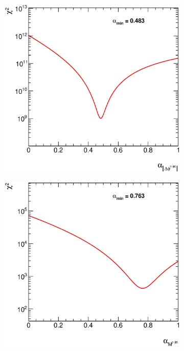 \documentclass[12pt, twoside]{article}
\numberwithin{equation}{section}
\numberwithin{figure}{section}
\newenvironment{changemargin}[2]{%
\begin{list}{}{%
\setlength{\topsep}{0pt}%
\setlength{\leftmargin}{#1}%
\setlength{\rightmargin}{#2}%
\setlength{\listparindent}{\parindent}%
\setlength{\itemindent}{\parindent}%
\setlength{\parsep}{\parskip}%
}%
\item[]}{\end{list}}
\begin{document}
\begin{figure}[H]
\begin{changemargin}{-0.5cm}{-0.0cm}
\begin{changemargin}{-0.0cm}{-0.5cm}
        \begin{subfigure}[b]{0.33\textwidth}
            \includegraphics[width=\textwidth]{./images/ChiSquareTest/CHI2-107.eps}
            \subcaption{}
            \label{fig:ChiSquareDeltaPhiPhotonJet}
        \end{subfigure}
        \begin{subfigure}[b]{0.33\textwidth}
            \includegraphics[width=\textwidth]{./images/ChiSquareTest/CHI2-108.eps}

\end{subfigure}
\end{changemargin}
\end{changemargin}
\end{figure}
\end{document}
